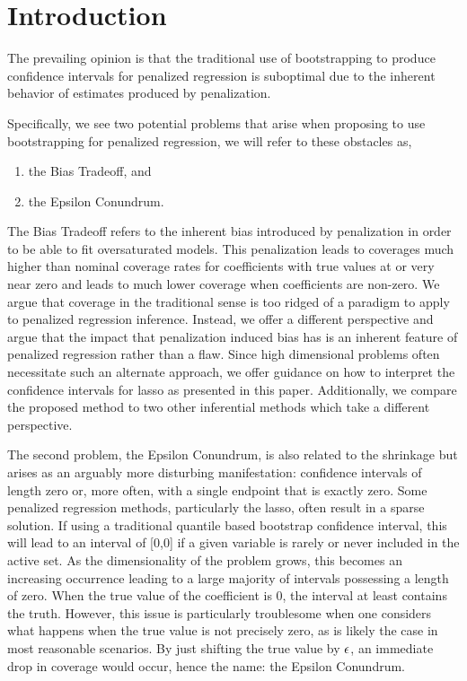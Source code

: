 \section{Introduction}

The prevailing opinion is that the traditional use of bootstrapping to produce confidence intervals for penalized regression is suboptimal due to the inherent behavior of estimates produced by penalization.

Specifically, we see two potential problems that arise when proposing to use bootstrapping for penalized regression, we will refer to these obstacles as,

\begin{enumerate}
\item the Bias Tradeoff, and
\item the Epsilon Conundrum.
\end{enumerate}

The Bias Tradeoff refers to the inherent bias introduced by penalization in order to be able to fit oversaturated models. This penalization leads to coverages much higher than nominal coverage rates for coefficients with true values at or very near zero and leads to much lower coverage when coefficients are non-zero. We argue that coverage in the traditional sense is too ridged of a paradigm to apply to penalized regression inference. Instead, we offer a different perspective and argue that the impact that penalization induced bias has is an inherent feature of penalized regression rather than a flaw. Since high dimensional problems often necessitate such an alternate approach, we offer guidance on how to interpret the confidence intervals for lasso as presented in this paper. Additionally, we compare the proposed method to two other inferential methods which take a different perspective.

The second problem, the Epsilon Conundrum, is also related to the shrinkage but arises as an arguably more disturbing manifestation: confidence intervals of length zero or, more often, with a single endpoint that is exactly zero. Some penalized regression methods, particularly the lasso, often result in a sparse solution. If using a traditional quantile based bootstrap confidence interval, this will lead to an interval of [0,0] if a given variable is rarely or never included in the active set. As the dimensionality of the problem grows, this becomes an increasing occurrence leading to a large majority of intervals possessing a length of zero. When the true value of the coefficient is 0, the interval at least contains the truth. However, this issue is particularly troublesome when one considers what happens when the true value is not precisely zero, as is likely the case in most reasonable scenarios. By just shifting the true value by $\epsilon$, an immediate drop in coverage would occur, hence the name: the Epsilon Conundrum.

